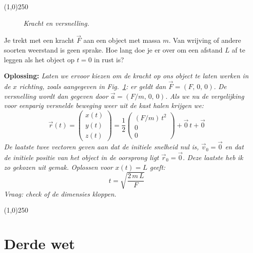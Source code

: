 \begin{center}
\line(1,0){250}
\end{center}

\begin{voorbeeld} 
\label{ex:newton:kracht}
 \begin{figure}[htbp]
\begin{center}
\caption{{\it Kracht en versnelling.}}
\label{fig:newton:wet2}
\end{center}
\end{figure} 
Je trekt met een kracht $\vec{F}$ aan een object met massa $m$. Van wrijving of andere
soorten weerstand is geen sprake. Hoe lang doe je er over om een afstand $L$ af te leggen als
het object op $t=0$ in rust is?

{\bf Oplossing: }{\it Laten we ervoor kiezen om de kracht op ons object te laten werken in de $x$ richting,
 zoals aangegeven in Fig.~\ref{fig:newton:wet2}: er geldt dan $\vec{F} = (F, \, 0,\,0)$. 
 De versnelling wordt
 dan gegeven door $\vec{a}=(F/m, \,0,\,0)$. Als we nu de vergelijking voor eenparig versnelde beweging
 weer uit de kast halen krijgen we:
 \begin{equation}
 \vec{r}(t) = \left(\begin{array}{c}
  x(t) \\
  y(t) \\
  z(t) 
  \end{array}\right)
  = \frac{1}{2}\left(\begin{array}{c}
  (F/m) \, t^2 \\
  0 \\
  0
 \end{array}\right)
  + \vec{0} \, t + \vec{0}
 \end{equation}
 De laatste twee vectoren geven aan dat de initiele snelheid nul is, $\vec{v}_0 = \vec{0}$ en dat de initiele
 positie van het object in de oorsprong ligt $\vec{r}_0 = \vec{0}$. Deze laatste heb ik zo gekozen uit gemak.
 Oplossen voor $x(t)=L$ geeft:
 \begin{equation}
 t = \sqrt{\frac{2 \,m \,L}{F}}
 \end{equation}
 Vraag: check of de dimensies kloppen.
 }
\end{voorbeeld}

\begin{center}
\line(1,0){250}
\end{center}


\section{Derde wet}

